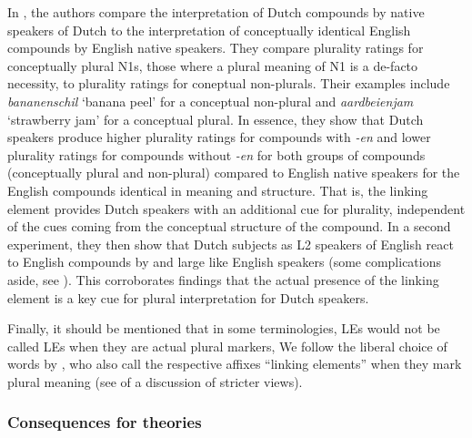 In \textcite{BangaEa2013b}, the authors compare the interpretation of Dutch compounds by native speakers of Dutch to the interpretation of conceptually identical English compounds by English native speakers.
They compare plurality ratings for conceptually plural N1s, \ie those where a plural meaning of N1 is a de-facto necessity, to plurality ratings for coneptual non-plurals.
Their examples include \textit{bananenschil} `banana peel' for a conceptual non-plural and \textit{aardbeienjam} `strawberry jam' for a conceptual plural.
In essence, they show that Dutch speakers produce higher plurality ratings for compounds with \textit{-en} and lower plurality ratings for compounds without \textit{-en} for both groups of compounds (conceptually plural and non-plural) compared to English native speakers for the English compounds identical in meaning and structure.
That is, the linking element provides Dutch speakers with an additional cue for plurality, independent of the cues coming from the conceptual structure of the compound.
In a second experiment, they then show that Dutch subjects as L2 speakers of English react to English compounds by and large like English speakers (some complications aside, see \citealt[211]{BangaEa2013b}).
This corroborates findings that the actual presence of the linking element is a key cue for plural interpretation for Dutch speakers.

Finally, it should be mentioned that in some terminologies, LEs would not be called LEs when they are actual plural markers,
We follow the liberal choice of words by \textcite{BangaEa2013b}, who also call the respective affixes ``linking elements'' when they mark plural meaning (see \citealt[196]{BangaEa2013b} of a discussion of stricter views).


\subsubsection{Consequences for theories}

